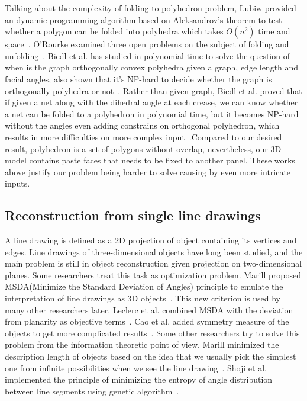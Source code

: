 \documentclass[submission]{gmp2018}
\begin{document}
Talking about the complexity of folding to polyhedron problem, Lubiw provided an dynamic programming algorithm based on Aleksandrov's theorem to test whether a polygon can be folded into polyhedra which takes $O(n^2)$ time and space~\cite{Lubiw1996When}. O'Rourke examined three open problems on the subject of folding and unfolding~\cite{O'Rourke:1998:FUC:646319.686376}. Biedl et al. has studied in polynomial time to solve the question of when is the graph orthogonally convex polyhedra given a graph, edge length and facial angles, also shown that it's NP-hard to decide whether the graph is orthogonally polyhedra or not~\cite{Biedl2004When}. Rather than given graph, Biedl et al.  proved that if given a net along with the dihedral angle at each crease, we can know whether a net can be folded to a polyhedron in polynomial time, but it becomes NP-hard without the angles even adding constrains on orthogonal polyhedron, which results in more difficulties on more complex input~\cite{Biedl:2005:NFP:1090462.1646553}.Compared to our desired result, polyhedron is a set of polygons without overlap, nevertheless, our 3D model contains paste faces that needs to be fixed to another panel. These works above justify our problem being harder to solve causing by even more intricate inputs.

\subsection{Reconstruction from single line drawings} 
A line drawing is defined as a 2D projection of object containing its vertices and edges. Line drawings of three-dimensional objects have long been studied, and the main problem is still in object reconstruction given projection on two-dimensional planes. Some researchers treat this task as optimization problem. Marill proposed MSDA(Minimize the Standard Deviation of Angles) principle to emulate the interpretation of line drawings as 3D objects~\cite{Marill:1991:EHI:113057.113061}. This new criterion is used by many other researchers later. Leclerc et al. combined MSDA with the deviation from planarity as objective terms~\cite{Leclerc1992An}. Cao et al. added symmetry measure of the objects to get more complicated results~\cite{Cao:2005:ORS:1097114.1097658}. Some other researchers try to solve this problem from the information theoretic point of view. Marill minimized the description length of objects based on the idea that we usually pick the simplest one from infinite possibilities when we see the line drawing~\cite{Marill1992Why}. Shoji et al. implemented the principle of minimizing the entropy of angle distribution between line segments using genetic algorithm~\cite{Shoji20013}. 
\end{document}
